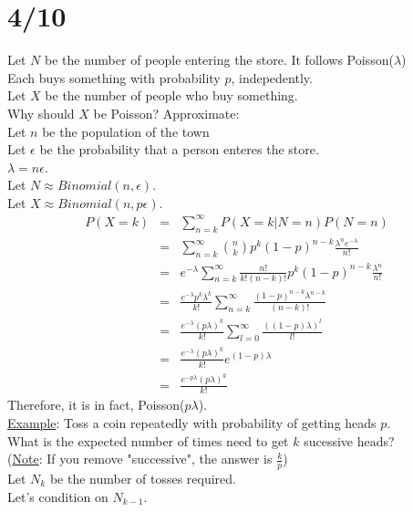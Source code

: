 \section*{4/10}
  Let $N$ be the number of people entering the store. It follows Poisson($\lambda$)\\
  Each buys something with probability $p$, indepedently.\\
  Let $X$ be the number of people who buy something.\\
  Why should $X$ be Poisson? Approximate:\\
  Let $n$ be the population of the town\\
  Let $\epsilon$ be the probability that a person enteres the store.\\
  $\lambda = n\epsilon$.\\
  Let $N \approx Binomial(n, \epsilon)$.\\
  Let $X \approx Binomial(n, p\epsilon)$.\\
  \begin{eqnarray*}
    P(X=k) & = & \sum_{n = k}^{\infty} P(X = k | N = n)P(N=n)\\
      & = & \sum_{n = k}^{\infty} \binom{n}{k}p^k(1-p)^{n-k} \frac{\lambda^ne^{-\lambda}}{n!}\\
      & = & e^{-\lambda} \sum_{n = k}^{\infty}\frac{n!}{k!(n-k)!} p^k (1-p)^{n-k} \frac{\lambda^n}{n!}\\
      & = & \frac{e^{-\lambda}p^k \lambda^k}{k!} \sum_{n = k}^{\infty} 
        \frac{(1-p)^{n-k}\lambda^{n-k}}{(n-k)!}\\
      & = & \frac{e^{-\lambda}(p\lambda)^k}{k!}\sum_{l = 0}^{\infty}\frac{((1-p)\lambda)^l}{l!}\\
      & = & \frac{e^{-\lambda}(p\lambda)^k}{k!} e^{(1-p)\lambda}\\
      & = & \frac{e^{-p\lambda}(p\lambda)^k}{k!}
  \end{eqnarray*}
  Therefore, it is in fact, Poisson($p\lambda$).\\
  \underline{Example}: Toss a coin repeatedly with probability of getting heads $p$.\\
    What is the expected number of times need to get $k$ sucessive heads?\\
    (\underline{Note}: If you remove "successive", the answer is $\frac{k}{p}$)\\
    Let $N_k$ be the number of tosses required.\\
    Let's condition on $N_{k-1}$.\\
